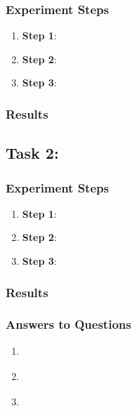 \documentclass{ExpReport}
\begin{document}
\subsubsection{Experiment Steps}

\begin{enumerate}[(1)]
    \item \textbf{Step 1}: 
    \item \textbf{Step 2}: 
    \item \textbf{Step 3}: 
\end{enumerate}

\subsubsection{Results}



\subsection{Task 2: }

\subsubsection{Experiment Steps}

\begin{enumerate}[(1)]
    \item \textbf{Step 1}: 
    \item \textbf{Step 2}: 
    \item \textbf{Step 3}: 
\end{enumerate}

\subsubsection{Results}

\subsubsection{Answers to Questions}

\begin{enumerate}[(1)]
    \item \textbf{}
    

    \item \textbf{}
    

    \item \textbf{}
    
\end{enumerate}
\end{document}
